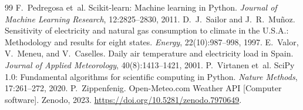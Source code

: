 \documentclass[9pt,twocolumn,letterpaper]{extarticle}
\begin{document}
\begin{thebibliography}{99}
 F.~Pedregosa et~al. Scikit-learn: Machine learning in Python. \emph{Journal of Machine Learning Research}, 12:2825--2830, 2011.
 D.~J.~Sailor and J.~R.~Mu\~noz. Sensitivity of electricity and natural gas consumption to climate in the U.S.A.: Methodology and results for eight states. \emph{Energy}, 22(10):987--998, 1997.
 E.~Valor, V.~Meneu, and V.~Caselles. Daily air temperature and electricity load in Spain. \emph{Journal of Applied Meteorology}, 40(8):1413--1421, 2001.
 P.~Virtanen et~al. SciPy 1.0: Fundamental algorithms for scientific computing in Python. \emph{Nature Methods}, 17:261--272, 2020.
 P.~Zippenfenig. Open-Meteo.com Weather API [Computer software]. Zenodo, 2023. \url{https://doi.org/10.5281/zenodo.7970649}.
\end{thebibliography}
\end{document}
